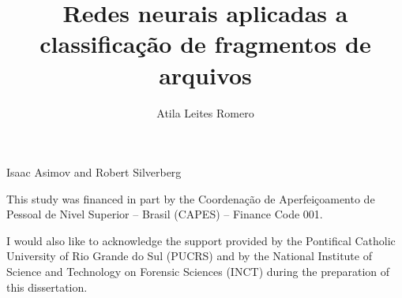 \documentclass[english,oneside]{pucrs-ppgcc}
\author{Atila Leites Romero}
\title{Redes neurais aplicadas a classificação de fragmentos de arquivos}
      {Neural networks applied to file fragment classification}
\begin{document}

%
         {Isaac Asimov and Robert Silverberg  \cite{asimov_nightfall_1991}}


\begin{agradecimentos}
This study was financed in part by the Coordenação de Aperfeiçoamento de Pessoal de Nivel Superior – Brasil (CAPES) – Finance Code 001.

I would also like to acknowledge the support provided by the Pontifical Catholic University of Rio Grande do Sul (PUCRS) and by the National Institute of Science and Technology on Forensic Sciences (INCT) during the preparation of this dissertation.

\end{agradecimentos}




\setcounter{tocdepth}{1}

\listoffigures       %
\listoftables        %
\listofacronyms      %
\tableofcontents     %
\end{document}
